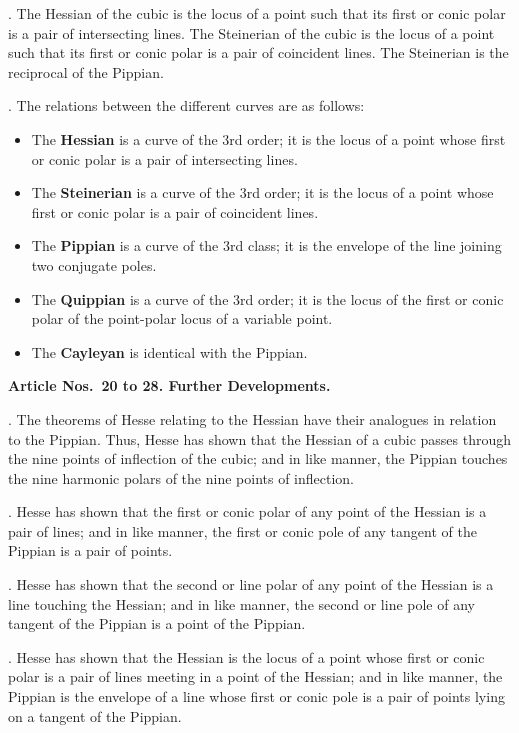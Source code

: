 \documentclass[12pt,a4paper]{article}
\theoremstyle{definition}
\begin{document}
. The Hessian of the cubic is the locus of a point such
that its first or conic polar is a pair of intersecting lines.
The Steinerian of the cubic is the locus of a point such that
its first or conic polar is a pair of coincident lines. The
Steinerian is the reciprocal of the Pippian.

. The relations between the different curves are as follows:
\begin{itemize}
\item[$\bullet$] The \textbf{Hessian} is a curve of the 3rd order; it is the
locus of a point whose first or conic polar is a pair of intersecting lines.
\item[$\bullet$] The \textbf{Steinerian} is a curve of the 3rd order; it is the
locus of a point whose first or conic polar is a pair of coincident lines.
\item[$\bullet$] The \textbf{Pippian} is a curve of the 3rd class; it is the
envelope of the line joining two conjugate poles.
\item[$\bullet$] The \textbf{Quippian} is a curve of the 3rd order; it is the
locus of the first or conic polar of the point-polar locus of a variable point.
\item[$\bullet$] The \textbf{Cayleyan} is identical with the Pippian.
\end{itemize}

\medskip\noindent\textbf{Article Nos.~20 to 28. Further Developments.}

. The theorems of Hesse relating to the Hessian have
their analogues in relation to the Pippian. Thus, Hesse has
shown that the Hessian of a cubic passes through the nine
points of inflection of the cubic; and in like manner, the Pippian
touches the nine harmonic polars of the nine points of inflection.

. Hesse has shown that the first or conic polar of any
point of the Hessian is a pair of lines; and in like manner,
the first or conic pole of any tangent of the Pippian is a pair
of points.

. Hesse has shown that the second or line polar of any
point of the Hessian is a line touching the Hessian; and in
like manner, the second or line pole of any tangent of the
Pippian is a point of the Pippian.

. Hesse has shown that the Hessian is the locus of a
point whose first or conic polar is a pair of lines meeting in
a point of the Hessian; and in like manner, the Pippian is
the envelope of a line whose first or conic pole is a pair of
points lying on a tangent of the Pippian.
\end{document}
